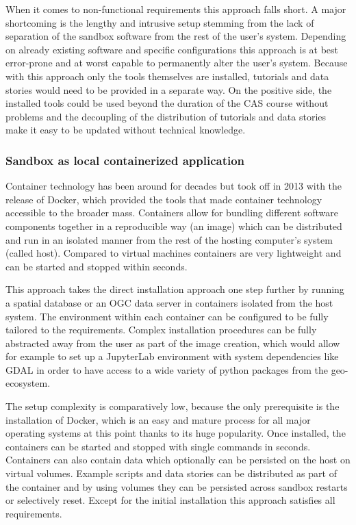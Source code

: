 \documentclass[11pt, a4paper, oneside, parskip=full-]{scrartcl}
\begin{document}
When it comes to non-functional requirements this approach falls short. A major
shortcoming is the lengthy and intrusive setup stemming from the lack of
separation of the sandbox software from the rest of the user's system. Depending
on already existing software and specific configurations this approach is at
best error-prone and at worst capable to permanently alter the user's system.
Because with this approach only the tools themselves are installed, tutorials
and data stories would need to be provided in a separate way. On the positive
side, the installed tools could be used beyond the duration of the CAS course
without problems and the decoupling of the distribution of tutorials and data
stories make it easy to be updated without technical knowledge.

\subsubsection*{Sandbox as local containerized application}
Container technology has been around for decades but took off in 2013 with the
release of Docker, which provided the tools that made container technology
accessible to the broader mass. Containers allow for bundling different software
components together in a reproducible way (an image) which can be distributed
and run in an isolated manner from the rest of the hosting computer's system
(called host). Compared to virtual machines containers are very lightweight and
can be started and stopped within seconds.

This approach takes the direct installation approach one step further by running
a spatial database or an OGC data server in containers isolated from the host
system. The environment within each container can be configured to be fully
tailored to the requirements. Complex installation procedures can be fully
abstracted away from the user as part of the image creation, which would allow
for example to set up a JupyterLab environment with system dependencies like
GDAL in order to have access to a wide variety of python packages from the
geo-ecosystem.

The setup complexity is comparatively low, because the only prerequisite is the
installation of Docker, which is an easy and mature process for all major
operating systems at this point thanks to its huge popularity. Once installed,
the containers can be started and stopped with single commands in seconds.
Containers can also contain data which optionally can be persisted on the host
on virtual volumes. Example scripts and data stories can be distributed as part
of the container and by using volumes they can be persisted across sandbox
restarts or selectively reset. Except for the initial installation this approach
satisfies all requirements.
\end{document}
